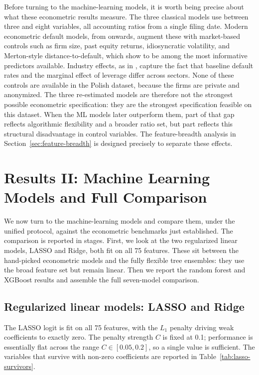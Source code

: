 \documentclass[12pt,a4paper]{article}
\begin{document}
Before turning to the machine-learning models, it is worth being precise about
what these econometric results measure. The three classical models use between
three and eight variables, all accounting ratios from a single filing date.
Modern econometric default models, from \cite{shumway2001} onwards, augment
these with market-based controls such as firm size, past equity returns,
idiosyncratic volatility, and Merton-style distance-to-default, which
\cite{campbell2008} show to be among the most informative predictors
available. Industry effects, as in \cite{chava2004}, capture the fact that
baseline default rates and the marginal effect of leverage differ across
sectors. None of these controls are available in the Polish dataset, because
the firms are private and anonymized. The three re-estimated models are
therefore not the strongest possible econometric specification: they are the
strongest specification feasible on this dataset. When the ML models later
outperform them, part of that gap reflects algorithmic flexibility and a
broader ratio set, but part reflects this structural disadvantage in control
variables. The feature-breadth analysis in Section~\ref{sec:feature-breadth}
is designed precisely to separate these effects.

\clearpage
\section{Results II: Machine Learning Models and Full Comparison}\label{sec:results-ml}

We now turn to the machine-learning models and compare them, under the
unified protocol, against the econometric benchmarks just established. The
comparison is reported in stages. First, we look at the two regularized linear
models, LASSO and Ridge, both fit on all 75 features. These sit between the
hand-picked econometric models and the fully flexible tree ensembles: they use
the broad feature set but remain linear. Then we report the random forest and
XGBoost results and assemble the full seven-model comparison.

\subsection{Regularized linear models: LASSO and Ridge}

The LASSO logit is fit on all 75 features, with the $L_1$ penalty driving
weak coefficients to exactly zero. The penalty strength $C$ is fixed at 0.1;
performance is essentially flat across the range $C \in [0.05, 0.2]$,
so a single value is sufficient. The
variables that survive with non-zero coefficients are reported in
Table~\ref{tab:lasso-survivors}.
\end{document}

